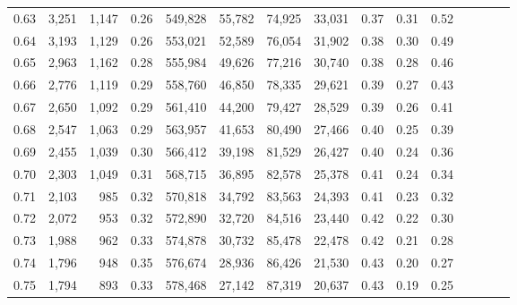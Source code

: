 \begin{tabular}{rrrcrrrrrrrrrrr}
0.63 &   3,251 &  1,147 &                                       0.26 &  549,828 &   55,782 &   74,925 &   33,031 &  0.37 &  0.31 &                         0.52 \\
0.64 &   3,193 &  1,129 &                                       0.26 &  553,021 &   52,589 &   76,054 &   31,902 &  0.38 &  0.30 &                         0.49 \\
0.65 &   2,963 &  1,162 &                                       0.28 &  555,984 &   49,626 &   77,216 &   30,740 &  0.38 &  0.28 &                         0.46 \\
0.66 &   2,776 &  1,119 &                                       0.29 &  558,760 &   46,850 &   78,335 &   29,621 &  0.39 &  0.27 &                         0.43 \\
0.67 &   2,650 &  1,092 &                                       0.29 &  561,410 &   44,200 &   79,427 &   28,529 &  0.39 &  0.26 &                         0.41 \\
0.68 &   2,547 &  1,063 &                                       0.29 &  563,957 &   41,653 &   80,490 &   27,466 &  0.40 &  0.25 &                         0.39 \\
0.69 &   2,455 &  1,039 &                                       0.30 &  566,412 &   39,198 &   81,529 &   26,427 &  0.40 &  0.24 &                         0.36 \\
0.70 &   2,303 &  1,049 &                                       0.31 &  568,715 &   36,895 &   82,578 &   25,378 &  0.41 &  0.24 &                         0.34 \\
0.71 &   2,103 &    985 &                                       0.32 &  570,818 &   34,792 &   83,563 &   24,393 &  0.41 &  0.23 &                         0.32 \\
0.72 &   2,072 &    953 &                                       0.32 &  572,890 &   32,720 &   84,516 &   23,440 &  0.42 &  0.22 &                         0.30 \\
0.73 &   1,988 &    962 &                                       0.33 &  574,878 &   30,732 &   85,478 &   22,478 &  0.42 &  0.21 &                         0.28 \\
0.74 &   1,796 &    948 &                                       0.35 &  576,674 &   28,936 &   86,426 &   21,530 &  0.43 &  0.20 &                         0.27 \\
0.75 &   1,794 &    893 &                                       0.33 &  578,468 &   27,142 &   87,319 &   20,637 &  0.43 &  0.19 &                         0.25 \\

\end{tabular}
